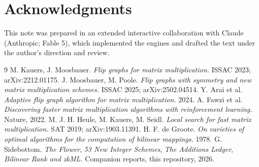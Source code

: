 \documentclass[10pt]{article}
\begin{document}
\section*{Acknowledgments}

This note was prepared in an extended interactive collaboration
with Claude (Anthropic; Fable 5), which implemented the engines and
drafted the text under the author's direction and review.

\begin{thebibliography}{9}
 M. Kauers, J. Moosbauer. \emph{Flip graphs for matrix
  multiplication.} ISSAC 2023; arXiv:2212.01175.
 J. Moosbauer, M. Poole. \emph{Flip graphs with
  symmetry and new matrix multiplication schemes.} ISSAC 2025;
  arXiv:2502.04514.
 Y. Arai et al. \emph{Adaptive flip graph algorithm
  for matrix multiplication.} 2024.
 A. Fawzi et al. \emph{Discovering faster
  matrix multiplication algorithms with reinforcement learning.}
  Nature, 2022.
 M. J. H. Heule, M. Kauers, M. Seidl. \emph{Local
  search for fast matrix multiplication.} SAT 2019;
  arXiv:1903.11391.
 H. F. de Groote. \emph{On varieties of optimal
  algorithms for the computation of bilinear mappings.} 1978.
 G. Sidebottom. \emph{The Flower}, \emph{53 New
  Integer Schemes}, \emph{The Additions Ledger}, \emph{Bilinear
  Rank and zkML.} Companion reports, this repository, 2026.
\end{thebibliography}
\end{document}

